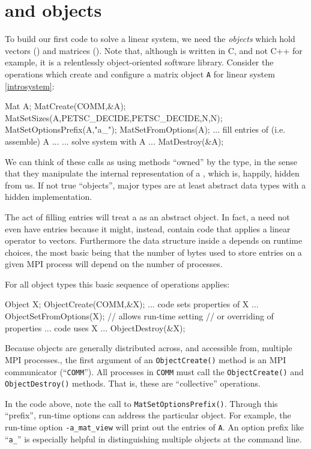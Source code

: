 \section{\PETSc \pVec and \pMat objects}

To build our first \PETSc code to solve a linear system, we need the \emph{objects} which hold vectors (\pVec) and matrices (\pMat).  Note that, although \PETSc is written in C, and not C++ for example, it is a relentlessly object-oriented software library.  Consider the operations which create and configure a matrix object \texttt{A} for linear system \eqref{introsystem}:
\begin{code}
Mat A;
MatCreate(COMM,&A);
MatSetSizes(A,PETSC_DECIDE,PETSC_DECIDE,N,N);
MatSetOptionsPrefix(A,"a_");
MatSetFromOptions(A);
... fill entries of (i.e. assemble) A ...
... solve system with A ...
MatDestroy(&A);
\end{code}
We can think of these calls as using methods ``owned'' by the \pMat type, in the sense that they manipulate the internal representation of a \pMat, which is, happily, hidden from us.  If not true ``objects'', major \PETSc types are at least abstract data types with a hidden implementation.

The act of filling entries will treat a \PETSc \pMat as an abstract object.  In fact, a \pMat need not even have entries because it might, instead, contain code that applies a linear operator to vectors.  Furthermore the data structure inside a \pMat depends on runtime choices, the most basic being that the number of bytes used to store entries on a given MPI process will depend on the number of processes.

For all \PETSc object types this basic sequence of operations applies:
\begin{code}
Object X;
ObjectCreate(COMM,&X);
... code sets properties of X ...
ObjectSetFromOptions(X);  // allows run-time setting
                          // or overriding of properties
... code uses X ...
ObjectDestroy(&X);
\end{code}
Because \PETSc objects are generally distributed across, and accessible from, multiple MPI processes., the first argument of an \texttt{ObjectCreate()} method is an MPI communicator (``\texttt{COMM}'').  All processes in \texttt{COMM} must call the \texttt{ObjectCreate()} and  \texttt{ObjectDestroy()} methods.  That is, these are ``collective'' operations.

In the \pMat code above, note the call to \texttt{MatSetOptionsPrefix()}.  Through this ``prefix'', run-time options can address the particular \pMat object.  For example, the run-time option \texttt{-a\_mat\_view} will print out the entries of \texttt{A}.  An option prefix like ``\texttt{a\_}'' is especially helpful in distinguishing multiple \pMat objects at the command line.

